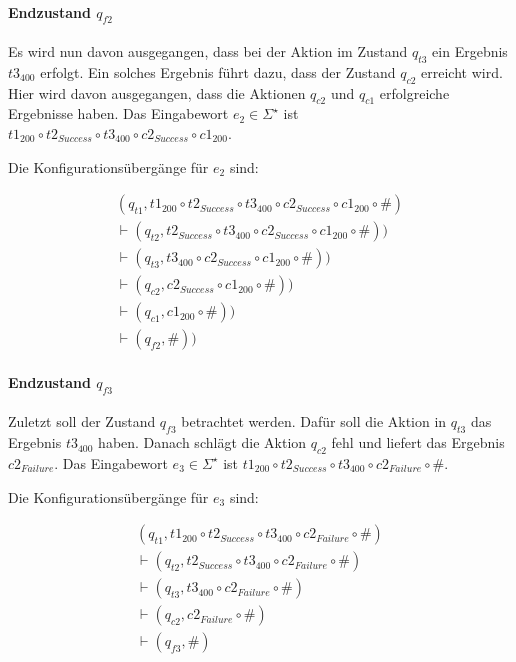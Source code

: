 \paragraph*{Endzustand $q_{f2}$}
Es wird nun davon ausgegangen, dass bei der Aktion im Zustand $q_{t3}$ ein Ergebnis $t3_{400}$ erfolgt. Ein solches Ergebnis führt dazu, dass der Zustand $q_{c2}$ erreicht wird. Hier wird davon ausgegangen, dass die Aktionen $q_{c2}$ und $q_{c1}$ erfolgreiche Ergebnisse haben. Das Eingabewort $e_2 \in \Sigma^{\star}$ ist $t1_{200} \circ t2_{Success} \circ t3_{400} \circ c2_{Success} \circ c1_{200}$.

Die Konfigurationsübergänge für $e_2$ sind:

\begin{align*}
(q_{t1}, t1_{200} \circ t2_{Success} \circ t3_{400} \circ c2_{Success} \circ c1_{200} \circ \#)\\
\vdash (q_{t2}, t2_{Success} \circ t3_{400} \circ c2_{Success} \circ c1_{200} \circ \#))\\
\vdash (q_{t3}, t3_{400} \circ c2_{Success} \circ c1_{200} \circ \#))\\
\vdash (q_{c2}, c2_{Success} \circ c1_{200} \circ \#))\\
\vdash (q_{c1}, c1_{200} \circ \#))\\
\vdash (q_{f2}, \#))
\end{align*}


\paragraph*{Endzustand $q_{f3}$}
Zuletzt soll der Zustand $q_{f3}$ betrachtet werden. Dafür soll die Aktion in $q_{t3}$ das Ergebnis $t3_{400}$ haben. Danach schlägt die Aktion $q_{c2}$ fehl und liefert das Ergebnis $c2_{Failure}$. Das Eingabewort $e_3 \in \Sigma^{\star}$ ist $t1_{200} \circ t2_{Success} \circ t3_{400} \circ c2_{Failure} \circ \#$.

Die Konfigurationsübergänge für $e_3$ sind:

\begin{align*}
(q_{t1}, t1_{200} \circ t2_{Success} \circ t3_{400} \circ c2_{Failure} \circ \#) \\
\vdash (q_{t2}, t2_{Success} \circ t3_{400} \circ c2_{Failure} \circ \#) \\
\vdash (q_{t3}, t3_{400} \circ c2_{Failure} \circ \#) \\
\vdash (q_{c2}, c2_{Failure} \circ \#) \\
\vdash (q_{f3}, \#) \\
\end{align*}

